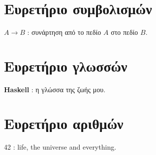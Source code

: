 \documentclass[diploma]{softlab-thesis}
\begin{document}
\backmatter

\appendix

\chapter{Ευρετήριο συμβολισμών}

$A \rightarrow B$ : συνάρτηση από το πεδίο $A$ στο πεδίο $B$.

\chapter{Ευρετήριο γλωσσών}

\textbf{Haskell} : η γλώσσα της ζωής μου.

\chapter{Ευρετήριο αριθμών}

42 : life, the universe and everything.


\end{document}
